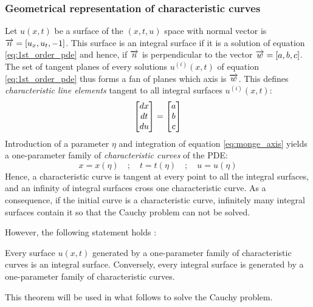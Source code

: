 \subsubsection*{Geometrical representation of characteristic curves}
Let $u(x,t)$ be a surface of the $(x,t,u)$ space with normal vector is ${\overrightarrow{n}}=[u_x,u_t,-1]$. This surface is an integral surface if it is a solution of equation \eqref{eq:1st_order_pde} and hence, if ${\overrightarrow{n}}$ is perpendicular to the vector ${\overrightarrow{w}}=[a,b,c]$.
The set of tangent planes of every solutions $u^{(i)}(x,t)$ of equation \eqref{eq:1st_order_pde} thus forms a fan of planes which axis is ${\overrightarrow{w}}$.
This defines \textit{characteristic line elements} tangent to all integral surfaces $u^{(i)}(x,t)$:
\begin{equation}
  \label{eq:monge_axis}
  \left[\begin{matrix}dx \\ dt \\ du\end{matrix}\right] = \left[\begin{matrix}a \\ b \\c\end{matrix}\right]
\end{equation}
Introduction of a parameter $\eta$ and integration of equation \eqref{eq:monge_axis} yields a one-parameter family of \textit{characteristic curves} of the PDE:
\begin{equation*}
  x=x(\eta) \quad ; \quad t=t(\eta) \quad ; \quad u=u(\eta)
\end{equation*}
Hence, a characteristic curve is tangent at every point to all the integral surfaces, and an infinity of integral surfaces cross one characteristic curve. As a consequence, if the initial curve is a characteristic curve, infinitely many integral surfaces contain it so that the Cauchy problem can not be solved.

However, the following statement holds \cite[Ch.1]{Courant}:
\begin{theorem}
  \label{th:integral_surface_generated}
  Every surface $u(x,t)$ generated by a one-parameter family of characteristic curves is an integral surface. Conversely, every integral surface is generated by a one-parameter family of characteristic curves.
\end{theorem}
This theorem will be used in what follows to solve the Cauchy problem.

